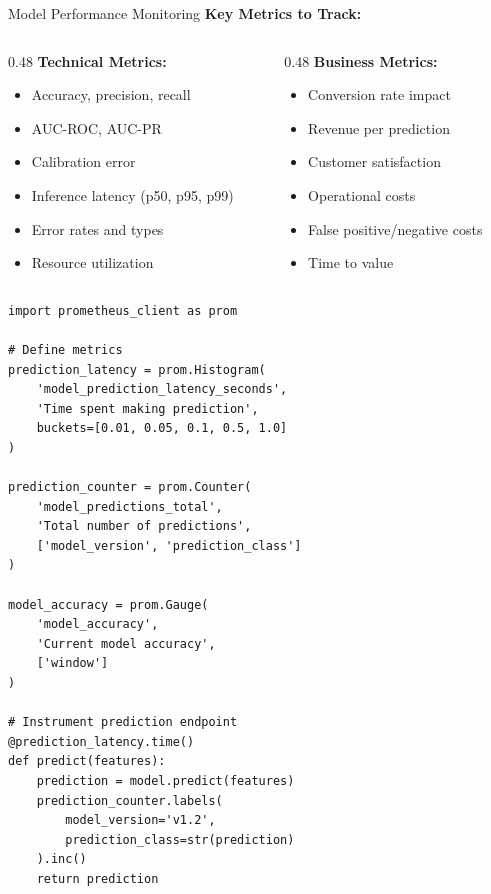 \begin{frame}[fragile]{Model Performance Monitoring}
\textbf{Key Metrics to Track:}
\begin{columns}
\begin{column}{0.48\textwidth}
\textbf{Technical Metrics:}
\begin{itemize}
\item Accuracy, precision, recall
\item AUC-ROC, AUC-PR
\item Calibration error
\item Inference latency (p50, p95, p99)
\item Error rates and types
\item Resource utilization
\end{itemize}
\end{column}

\begin{column}{0.48\textwidth}
\textbf{Business Metrics:}
\begin{itemize}
\item Conversion rate impact
\item Revenue per prediction
\item Customer satisfaction
\item Operational costs
\item False positive/negative costs
\item Time to value
\end{itemize}
\end{column}
\end{columns}

\vspace{0.3cm}
\begin{lstlisting}[basicstyle=\ttfamily\tiny]
import prometheus_client as prom

# Define metrics
prediction_latency = prom.Histogram(
    'model_prediction_latency_seconds',
    'Time spent making prediction',
    buckets=[0.01, 0.05, 0.1, 0.5, 1.0]
)

prediction_counter = prom.Counter(
    'model_predictions_total',
    'Total number of predictions',
    ['model_version', 'prediction_class']
)

model_accuracy = prom.Gauge(
    'model_accuracy',
    'Current model accuracy',
    ['window']
)

# Instrument prediction endpoint
@prediction_latency.time()
def predict(features):
    prediction = model.predict(features)
    prediction_counter.labels(
        model_version='v1.2',
        prediction_class=str(prediction)
    ).inc()
    return prediction
\end{lstlisting}
\end{frame}

